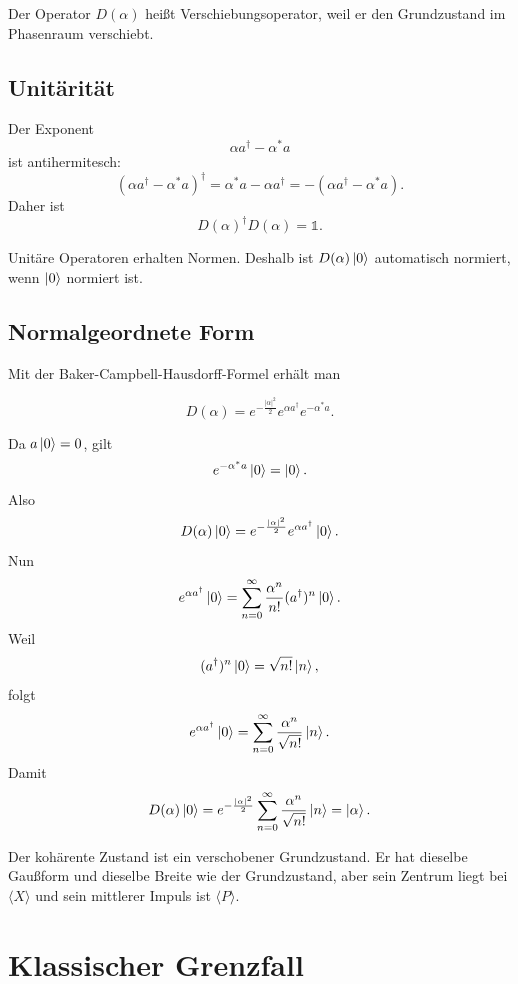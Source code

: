Der Operator \(D(\alpha)\) heißt Verschiebungsoperator, weil er den Grundzustand im Phasenraum verschiebt.

\subsection{Unitärität}

Der Exponent
\[
    \alpha a^\dagger-\alpha^*a
\]
ist antihermitesch:
\[
    (\alpha a^\dagger-\alpha^*a)^\dagger
    =\alpha^* a-\alpha a^\dagger
    =-(\alpha a^\dagger-\alpha^*a).
\]
Daher ist
\[
    D(\alpha)^\dagger D(\alpha)=\mathbb{1}.
\]

\begin{notebox}
Unitäre Operatoren erhalten Normen. Deshalb ist \(D(\alpha)\left|0\right\rangle\) automatisch normiert, wenn \(\left|0\right\rangle\) normiert ist.
\end{notebox}

\subsection{Normalgeordnete Form}

Mit der Baker-Campbell-Hausdorff-Formel erhält man
\begin{formulabox}
\[
    D(\alpha)=e^{-\frac{|\alpha|^2}{2}}e^{\alpha a^\dagger}e^{-\alpha^*a}.
\]
\end{formulabox}

Da \(a\left|0\right\rangle=0\), gilt
\[
    e^{-\alpha^*a}\left|0\right\rangle=\left|0\right\rangle.
\]
Also
\[
    D(\alpha)\left|0\right\rangle
    =e^{-\frac{|\alpha|^2}{2}}e^{\alpha a^\dagger}\left|0\right\rangle.
\]
Nun
\[
    e^{\alpha a^\dagger}\left|0\right\rangle
    =\sum_{n=0}^{\infty}\frac{\alpha^n}{n!}(a^\dagger)^n\left|0\right\rangle.
\]
Weil
\[
    (a^\dagger)^n\left|0\right\rangle=\sqrt{n!}\left|n\right\rangle,
\]
folgt
\[
    e^{\alpha a^\dagger}\left|0\right\rangle
    =\sum_{n=0}^{\infty}\frac{\alpha^n}{\sqrt{n!}}\left|n\right\rangle.
\]
Damit
\[
    D(\alpha)\left|0\right\rangle
    =e^{-\frac{|\alpha|^2}{2}}
    \sum_{n=0}^{\infty}\frac{\alpha^n}{\sqrt{n!}}\left|n\right\rangle
    =\left|\alpha\right\rangle.
\]

\begin{conceptbox}
Der kohärente Zustand ist ein verschobener Grundzustand. Er hat dieselbe Gaußform und dieselbe Breite wie der Grundzustand, aber sein Zentrum liegt bei \(\langle X\rangle\) und sein mittlerer Impuls ist \(\langle P\rangle\).
\end{conceptbox}

\section{Klassischer Grenzfall}

